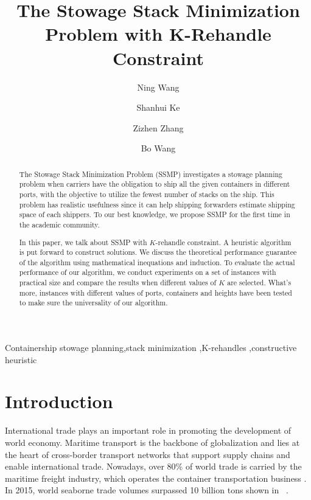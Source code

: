 \documentclass[review,3p,times,authoryear,12pt]{elsarticle}
\begin{document}
\begin{frontmatter}
\newpage

\title{The Stowage Stack Minimization Problem with K-Rehandle Constraint}
\author[shu]{Ning Wang}

\author[shu]{Shanhui Ke}

\author[syu]{Zizhen Zhang}

\author[set]{Bo Wang}


\address[shu]{
Department of Information Management, School of Management, Shanghai University, Shanghai, China
}
\address[syu]{
School of Data and Computer Science, Sun Yat-Sen University, China
}
\address[set]{
Shanghai University of Engineering Science
}

\begin{abstract}
The Stowage Stack Minimization Problem (SSMP) investigates a stowage planning problem when carriers have the obligation to ship all the given containers in different ports, with the objective to utilize the fewest number of stacks on the ship. This problem has realistic usefulness since it can help shipping forwarders estimate shipping space of each shippers.
To our best knowledge, we propose SSMP for the first time in the academic community.

In this paper, we talk about SSMP with $K$-rehandle constraint. A heuristic algorithm is put forward to construct solutions. We discuss the theoretical performance guarantee of the algorithm using mathematical inequations and induction.
To evaluate the actual performance of our algorithm, we conduct experiments on a set of instances with practical size and compare the results when different values of $K$ are selected.
What's more, instances with different values of ports, containers and heights have been tested to make sure the universality of our algorithm.
\end{abstract}

\begin{keyword}
Containership stowage planning\sep stack minimization \sep K-rehandles \sep constructive heuristic
\end{keyword}
\end{frontmatter}


\section{Introduction}
\label{sec:i}
International trade plays an important role in promoting the development of world economy.
Maritime transport is the backbone of globalization and lies at the heart of cross-border transport networks that support supply chains and enable international trade.
Nowadays, over 80\% of world trade is carried by the maritime freight industry, which operates the container transportation business \citep{zhang2016multiobjective}.
In 2015, world seaborne trade volumes surpassed 10 billion tons shown in ~\cite{unctad2016}.
\end{document}
